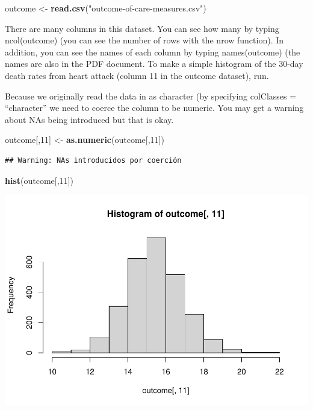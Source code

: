 \documentclass[
]{article}
\newenvironment{Shaded}{\begin{snugshade}}{\end{snugshade}}
\newcommand{\DecValTok}[1]{\textcolor[rgb]{0.00,0.00,0.81}{#1}}
\newcommand{\KeywordTok}[1]{\textcolor[rgb]{0.13,0.29,0.53}{\textbf{#1}}}
\newcommand{\NormalTok}[1]{#1}
\newcommand{\StringTok}[1]{\textcolor[rgb]{0.31,0.60,0.02}{#1}}
\begin{document}
\begin{Shaded}
\begin{Highlighting}[]
\NormalTok{outcome <-}\StringTok{ }\KeywordTok{read.csv}\NormalTok{(}\StringTok{"outcome-of-care-measures.csv"}\NormalTok{)}
\end{Highlighting}
\end{Shaded}

There are many columns in this dataset. You can see how many by typing
ncol(outcome) (you can see the number of rows with the nrow function).
In addition, you can see the names of each column by typing
names(outcome) (the names are also in the PDF document. To make a simple
histogram of the 30-day death rates from heart attack (column 11 in the
outcome dataset), run.

Because we originally read the data in as character (by specifying
colClasses = ``character'' we need to coerce the column to be numeric.
You may get a warning about NAs being introduced but that is okay.

\begin{Shaded}
\begin{Highlighting}[]
\NormalTok{outcome[,}\DecValTok{11}\NormalTok{] <-}\StringTok{ }\KeywordTok{as.numeric}\NormalTok{(outcome[,}\DecValTok{11}\NormalTok{])}
\end{Highlighting}
\end{Shaded}

\begin{verbatim}
## Warning: NAs introducidos por coerción
\end{verbatim}

\begin{Shaded}
\begin{Highlighting}[]
\KeywordTok{hist}\NormalTok{(outcome[,}\DecValTok{11}\NormalTok{])}
\end{Highlighting}
\end{Shaded}

\includegraphics{Assigment3Ver2_files/figure-latex/unnamed-chunk-3-1.pdf}
\end{document}
